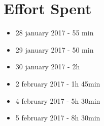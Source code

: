 \section{Effort Spent}

\begin{itemize}
	\item 28 january 2017 - 55 min
	\item 29 january 2017 - 50 min
	\item 30 january 2017 - 2h
	\item 2 february 2017 - 1h 45min
	\item 4 february 2017 - 5h 30min
	\item 5 february 2017 - 8h 30min
\end{itemize}
